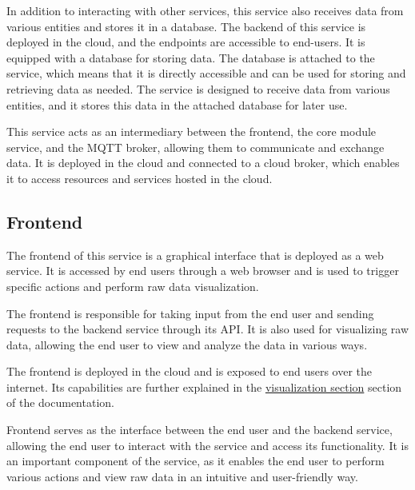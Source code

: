 In addition to interacting with other services, this service also receives data from various entities and stores it in a database. The backend of this service is deployed in the cloud, and the endpoints are accessible to end-users. It is equipped with a database for storing data. The database is attached to the service, which means that it is directly accessible and can be used for storing and retrieving data as needed. The service is designed to receive data from various entities, and it stores this data in the attached database for later use.

This service acts as an intermediary between the frontend, the core module service, and the MQTT broker, allowing them to communicate and exchange data. It is deployed in the cloud and connected to a cloud broker, which enables it to access resources and services hosted in the cloud.

\subsection{Frontend}
The frontend of this service is a graphical interface that is deployed as a web service. It is accessed by end users through a web browser and is used to trigger specific actions and perform raw data visualization.

The frontend is responsible for taking input from the end user and sending requests to the backend service through its API. It is also used for visualizing raw data, allowing the end user to view and analyze the data in various ways.

The frontend is deployed in the cloud and is exposed to end users over the internet. Its capabilities are further explained in the \hyperref[sec:0308]{visualization section} section of the documentation.

Frontend serves as the interface between the end user and the backend service, allowing the end user to interact with the service and access its functionality. It is an important component of the service, as it enables the end user to perform various actions and view raw data in an intuitive and user-friendly way.
